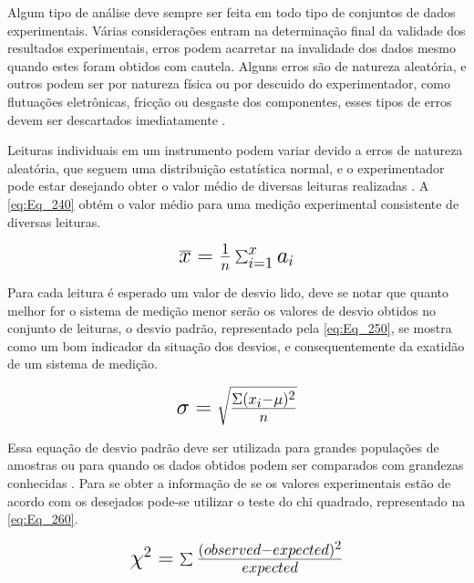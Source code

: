 Algum tipo de análise deve sempre ser feita em todo tipo de conjuntos de dados experimentais. Várias considerações entram na determinação final da validade dos resultados
experimentais, erros podem acarretar na invalidade dos dados mesmo quando estes foram obtidos com cautela. Alguns erros são de natureza aleatória, e outros podem ser por
natureza física ou por descuido do experimentador, como flutuações eletrônicas, fricção ou desgaste dos componentes, esses tipos de erros devem ser descartados imediatamente
\autocite{Hollman2011}.

Leituras individuais em um instrumento podem variar devido a erros de natureza aleatória, que seguem uma distribuição estatística normal, e o experimentador pode estar
desejando obter o valor médio de diversas leituras realizadas \autocite{Hollman2011}. A \autoref{eq:Eq_240} obtém o valor médio para uma medição experimental consistente
de diversas leituras.

\begin{equation}\label{eq:Eq_240}%
\mbox{\fontsize{17.28}{21.6}\selectfont\( %
\overline{x} = {\frac {1}{n}}\sum _{i=1}^{x}a_{i}
\)} %
\end{equation}

\hfill

Para cada leitura é esperado um valor de desvio lido, deve se notar que quanto melhor for o sistema de medição menor serão os valores de desvio obtidos no conjunto de
leituras, o desvio padrão, representado pela \autoref{eq:Eq_250}, se mostra como um bom indicador da situação dos desvios, e consequentemente da exatidão de um sistema de
medição.

\begin{equation}\label{eq:Eq_250}%
\mbox{\fontsize{17.28}{21.6}\selectfont\( %
\sigma = \sqrt{\frac{\Sigma(x_i-\mu)^{2}}{n}}
\)} %
\end{equation}

\hfill

Essa equação de desvio padrão deve ser utilizada para grandes populações de amostras ou para quando os dados obtidos podem ser comparados com grandezas
conhecidas \autocite{Hollman2011}. Para se obter a informação de se os valores experimentais estão de acordo com os desejados pode-se utilizar o teste do chi quadrado,
representado na \autoref{eq:Eq_260}.

\begin{equation}\label{eq:Eq_260}%
\mbox{\fontsize{17.28}{21.6}\selectfont\( %
\chi^{2} = \sum{\frac{(observed - expected)^{2}}{expected}}
\)} %
\end{equation}

